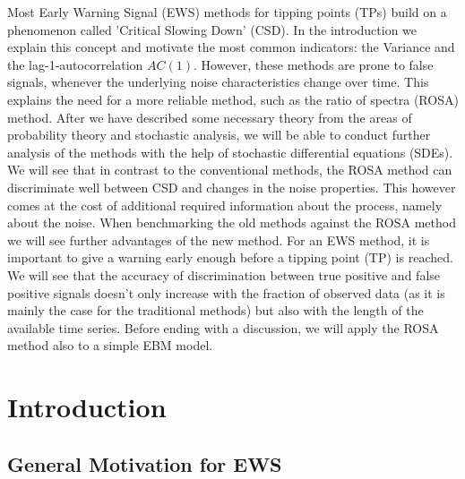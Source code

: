 \documentclass[%
thesis=student,%
coverpage=false,%
titlepage=false,%
headmarks=true, %
english,%
font=libertine, %
math=newpxtx, %
BCOR=5mm,%
coverBCOR=11mm%
]{tumbook}
\begin{document}
Most Early Warning Signal (EWS) methods for tipping points (TPs) build on a phenomenon called 'Critical Slowing Down' (CSD). In the introduction we explain this concept and motivate the most common indicators: the Variance and the lag-1-autocorrelation $AC(1)$. However, these methods are prone to false signals, whenever the underlying noise characteristics change over time. This explains the need for a more reliable method, such as the ratio of spectra (ROSA) method. After we have described some necessary theory from the areas of probability theory and stochastic analysis, we will be able to conduct further analysis of the methods with the help of stochastic differential equations (SDEs).
We will see that in contrast to the conventional methods, the ROSA method can discriminate well between CSD and changes in the noise properties. This however comes at the cost of additional required information about the process, namely about the noise. When benchmarking the old methods against the ROSA method we will see further advantages of the new method. For an EWS method, it is important to give a warning early enough before a tipping point (TP) is reached. We will see that the accuracy of discrimination between true positive and false positive signals doesn't only increase with the fraction of observed data (as it is mainly the case for the traditional methods) but also with the length of the available time series. Before ending with a discussion, we will apply the ROSA method also to a simple EBM model.



\cleardoublepage{}

\tableofcontents

\mainmatter{}
\chapter{Introduction}

\section{General Motivation for EWS}%
\label{sec:General  Motivation for EWS}
\end{document}
